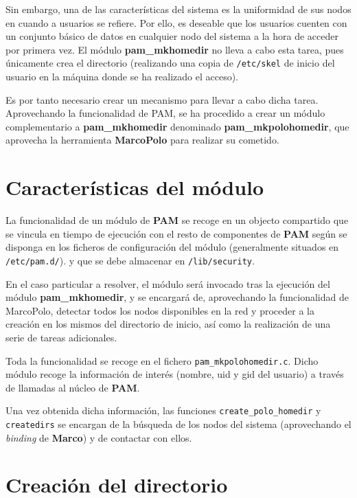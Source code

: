 \documentclass{article}
\begin{document}
Sin embargo, una de las características del sistema es la uniformidad de sus nodos en cuando a usuarios se refiere. Por ello, es deseable que los usuarios cuenten con un conjunto básico de datos en cualquier nodo del sistema a la hora de acceder por primera vez. El módulo \textbf{pam\_mkhomedir} no lleva a cabo esta tarea, pues únicamente crea el directorio (realizando una copia de \texttt{/etc/skel} de inicio del usuario en la máquina donde se ha realizado el acceso).

Es por tanto necesario crear un mecanismo para llevar a cabo dicha tarea. Aprovechando la funcionalidad de PAM, se ha procedido a crear un módulo complementario a \textbf{pam\_mkhomedir} denominado \textbf{pam\_mkpolohomedir}, que aprovecha la herramienta \textbf{MarcoPolo} para realizar su cometido.

\section{Características del módulo}

La funcionalidad de un módulo de \textbf{PAM} se recoge en un objecto compartido que se vincula en tiempo de ejecución con el resto de componentes de \textbf{PAM} según se disponga en los ficheros de configuración del módulo (generalmente situados en \texttt{/etc/pam.d/}). \cite{linux-pam-guide} y que se debe almacenar en \texttt{/lib/security}.  

En el caso particular a resolver, el módulo será invocado tras la ejecución del módulo \textbf{pam\_mkhomedir}, y se encargará de, aprovechando la funcionalidad de MarcoPolo, detectar todos los nodos disponibles en la red y proceder a la creación en los mismos del directorio de inicio, así como la realización de una serie de tareas adicionales.

Toda la funcionalidad se recoge en el fichero \texttt{pam\_mkpolohomedir.c}. Dicho módulo recoge la información de interés (nombre, uid y gid del usuario) a través de llamadas al núcleo de \textbf{PAM}\cite{linux-pam-guide-ch2}.


Una vez obtenida dicha información, las funciones \texttt{create\_polo\_homedir} y \texttt{createdirs} se encargan de la búsqueda de los nodos del sistema (aprovechando el \textit{binding} de \textbf{Marco}) y de contactar con ellos.

\section{Creación del directorio}
\end{document}
